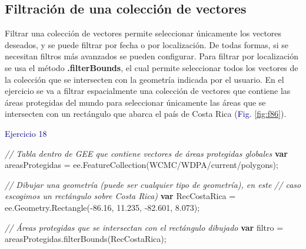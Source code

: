 \documentclass[
  12pt,
  letterpaper,
  twoside]{book}
\newenvironment{Shaded}{\begin{snugshade}}{\end{snugshade}}
\newcommand{\AttributeTok}[1]{\textcolor[rgb]{0.48,0.12,0.64}{#1}}
\newcommand{\CommentTok}[1]{\textcolor[rgb]{0.24,0.58,0.00}{\textit{#1}}}
\newcommand{\FloatTok}[1]{\textcolor[rgb]{0.28,0.53,0.93}{#1}}
\newcommand{\FunctionTok}[1]{\textcolor[rgb]{0.48,0.12,0.64}{#1}}
\newcommand{\KeywordTok}[1]{\textcolor[rgb]{0.00,0.00,0.00}{\textbf{#1}}}
\newcommand{\NormalTok}[1]{#1}
\newcommand{\OperatorTok}[1]{\textcolor[rgb]{0.00,0.00,0.00}{#1}}
\newcommand{\StringTok}[1]{\textcolor[rgb]{0.87,0.29,0.22}{#1}}
\newcommand\boldpurple[1]{\textcolor{darkpurple}{\textbf{#1}}}
\begin{document}
\hypertarget{filtraciuxf3n-de-una-colecciuxf3n-de-vectores}{%
\subsection*{Filtración de una colección de vectores}\label{filtraciuxf3n-de-una-colecciuxf3n-de-vectores}}

Filtrar una colección de vectores permite seleccionar únicamente los vectores deseados, y se puede filtrar por fecha o por localización. De todas formas, si se necesitan filtros más avanzados se pueden configurar. Para filtrar por localización se usa el método \boldpurple{.filterBounds}, el cual permite seleccionar todos los vectores de la colección que se intersecten con la geometría indicada por el usuario. En el ejercicio se va a filtrar espacialmente una colección de vectores que contiene las áreas protegidas del mundo para seleccionar únicamente las áreas que se intersecten con un rectángulo que abarca el país de Costa Rica (\textcolor{darkblue}{Fig.} \ref{fig:f86}).

\textcolor{darkblue}{Ejercicio 18}

\begin{Shaded}
\begin{Highlighting}[]
\CommentTok{// Tabla dentro de GEE que contiene vectores de áreas protegidas globales}
\KeywordTok{var}\NormalTok{ areasProtegidas }\OperatorTok{=}\NormalTok{ ee}\OperatorTok{.}\FunctionTok{FeatureCollection}\NormalTok{(}\StringTok{\textquotesingle{}WCMC/WDPA/current/polygons\textquotesingle{}}\NormalTok{)}\OperatorTok{;} 

\CommentTok{// Dibujar una geometría (puede ser cualquier tipo de geometría), en este}
\CommentTok{// caso escogimos un rectángulo sobre Costa Rica)}
\KeywordTok{var}\NormalTok{ RecCostaRica }\OperatorTok{=}\NormalTok{ ee}\OperatorTok{.}\AttributeTok{Geometry}\OperatorTok{.}\FunctionTok{Rectangle}\NormalTok{(}\OperatorTok{{-}}\FloatTok{86.16}\OperatorTok{,} \FloatTok{11.235}\OperatorTok{,} \OperatorTok{{-}}\FloatTok{82.601}\OperatorTok{,} \FloatTok{8.073}\NormalTok{)}\OperatorTok{;}

\CommentTok{// Áreas protegidas que se intersectan con el rectángulo dibujado}
\KeywordTok{var}\NormalTok{ filtro }\OperatorTok{=}\NormalTok{ areasProtegidas}\OperatorTok{.}\FunctionTok{filterBounds}\NormalTok{(RecCostaRica)}\OperatorTok{;}
\end{Highlighting}
\end{Shaded}
\end{document}
